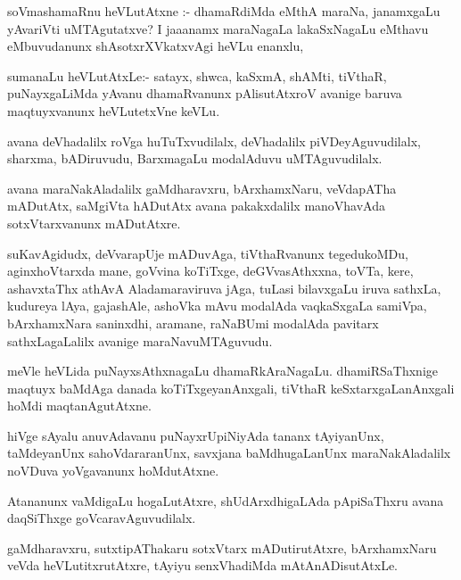 \documentclass{article}
\begin{document}
\begin{mn}
soVmashamaRnu heVLutAtxne :- dhamaRdiMda eMthA maraNa, janamxgaLu yAvariVti 
uMTAgutatxve?  I jaaanamx maraNagaLa lakaSxNagaLu eMthavu eMbuvudanunx 
shAsotxrXVkatxvAgi heVLu enanxlu,
\end{mn}

\begin{mn}
sumanaLu heVLutAtxLe:- satayx, shwca, kaSxmA, shAMti, tiVthaR, puNayxgaLiMda 
yAvanu dhamaRvanunx pAlisutAtxroV avanige baruva maqtuyxvanunx heVLutetxVne keVLu.
\end{mn}

\begin{mn}
avana deVhadalilx roVga huTuTxvudilalx,  deVhadalilx piVDeyAguvudilalx, 
sharxma, bADiruvudu, BarxmagaLu modalAduvu uMTAguvudilalx. 
\end{mn}

\begin{mn}
avana  maraNakAladalilx  gaMdharavxru,  bArxhamxNaru,  veVdapATha  mADutAtx, 
saMgiVta hADutAtx avana pakakxdalilx manoVhavAda  sotxVtarxvanunx mADutAtxre.
\end{mn}

\begin{mn}
suKavAgidudx,  deVvarapUje  mADuvAga,  tiVthaRvanunx tegedukoMDu, aginxhoVtarxda 
mane, goVvina koTiTxge,  deGVvasAthxxna, toVTa, kere, ashavxtaThx athAvA 
Aladamaraviruva jAga,  tuLasi bilavxgaLu iruva sathxLa, kudureya lAya, 
gajashAle, ashoVka mAvu modalAda vaqkaSxgaLa samiVpa, bArxhamxNara saninxdhi, 
aramane, raNaBUmi modalAda pavitarx sathxLagaLalilx avanige maraNavuMTAguvudu.
\end{mn}

\begin{mn}
meVle heVLida puNayxsAthxnagaLu dhamaRkAraNagaLu.  dhamiRSaThxnige maqtuyx baMdAga 
danada koTiTxgeyanAnxgali,  tiVthaR keSxtarxgaLanAnxgali hoMdi maqtanAgutAtxne. 
\end{mn}

\begin{mn}
hiVge sAyalu anuvAdavanu puNayxrUpiNiyAda tananx tAyiyanUnx,  taMdeyanUnx 
sahoVdararanUnx, savxjana baMdhugaLanUnx maraNakAladalilx noVDuva yoVgavanunx hoMdutAtxne.
\end{mn}

\begin{mn}
Atananunx  vaMdigaLu hogaLutAtxre, shUdArxdhigaLAda pApiSaThxru avana daqSiThxge goVcaravAguvudilalx.
\end{mn}

\begin{mn}
gaMdharavxru, sutxtipAThakaru sotxVtarx mADutirutAtxre,  bArxhamxNaru veVda heVLutitxrutAtxre,  
tAyiyu senxVhadiMda mAtAnADisutAtxLe.
\end{mn}
\end{document}

